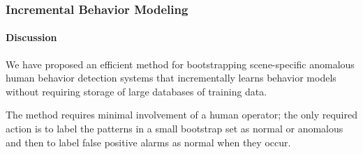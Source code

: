 
\begin{frame}
    \frametitle{Incremental Behavior Modeling}
    \framesubtitle{Discussion}

    We have proposed an efficient method for bootstrapping 
    scene-specific anomalous human behavior detection systems that 
    incrementally learns behavior models \alert{without} requiring storage
    of large databases of training data. 
    
    \bigskip
    
    The method requires minimal involvement of a human operator; the only 
    required action is to label the 
    patterns in a small bootstrap set as normal or anomalous and
    then to label false positive alarms as normal when they occur.

\end{frame}

\fi

